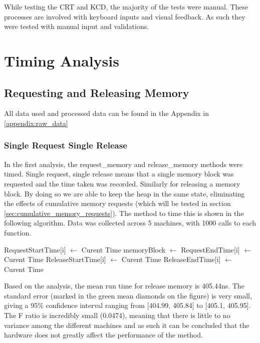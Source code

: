\documentclass[12pt]{report}
\begin{document}
While testing the CRT and KCD, the majority of the tests were manual. These processes are involved with keyboard inputs and visual feedback. As such they were tested with manual input and validations. 


\chapter{Timing Analysis}

\section{Requesting and Releasing Memory}

\par All data used and processed data can be found in the Appendix in \ref{appendix:raw_data}

\subsection{Single Request Single Release}
\label{sec:single_request_single_release}
In the first analysis, the request\_memory and release\_memory methods were timed. Single request, single release means that a single memory block was requested and the time taken was recorded. Similarly for releasing a memory block. By doing so we are able to keep the heap in the same state, eliminating the effects of cumulative memory requests (which will be tested in section \ref{sec:cumulative_memory_requests}). The method to time this is shown in the following algorithm. Data was collected across 5 machines, with 1000 calls to each function.

\begin{algorithmic}
      \State RequestStartTime[i] $\gets$ Curent Time
      \State memoryBlock $\gets$  
      \State RequestEndTime[i] $\gets$ Curent Time
      \State ReleaseStartTime[i] $\gets$ Curent Time
      \State {}
      \State ReleaseEndTime[i] $\gets$ Curent Time
    \EndFor
  \EndFunction
\end{algorithmic}

Based on the analysis, the mean run time for release memory is 405.44ns. The standard error (marked in the green mean diamonds on the figure) is very small, giving a 95\% confidence interval ranging from [404.99, 405.84] to [405.1, 405.95]. The F ratio is incredibly small (0.0474), meaning that there is little to no variance among the different machines and as such it can be concluded that the hardware does not greatly affect the performance of the method.
\end{document}
